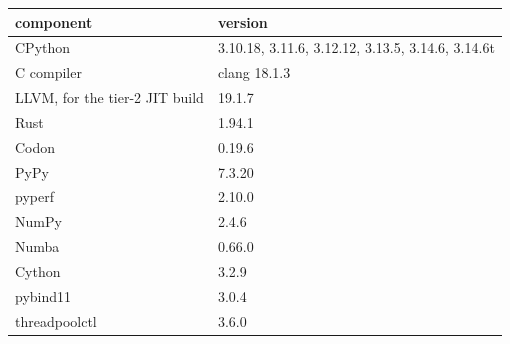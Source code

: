 \begin{tabular}{ll}
\toprule
component & version \\
\midrule
CPython & 3.10.18, 3.11.6, 3.12.12, 3.13.5, 3.14.6, 3.14.6t \\
C compiler & clang 18.1.3 \\
LLVM, for the tier-2 JIT build & 19.1.7 \\
Rust & 1.94.1 \\
Codon & 0.19.6 \\
PyPy & 7.3.20 \\
pyperf & 2.10.0 \\
NumPy & 2.4.6 \\
Numba & 0.66.0 \\
Cython & 3.2.9 \\
pybind11 & 3.0.4 \\
threadpoolctl & 3.6.0 \\
\bottomrule
\end{tabular}
